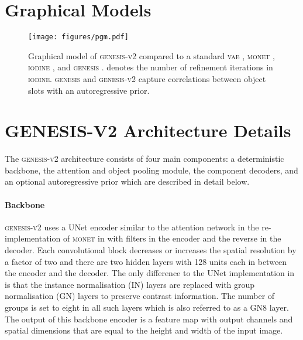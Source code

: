 \documentclass{article}
\begin{document}
\appendix


\section{Graphical Models}
\label{app:pgm}

\begin{figure}[h!]
	\centering
	\texttt{[image: figures/pgm.pdf]}
	\caption{Graphical model of \textsc{genesis-v2} compared to a standard \textsc{vae} \cite{kingma2013auto,rezende2014stochastic}, \textsc{monet} \cite{burgess2019monet}, \textsc{iodine} \cite{greff2019multi}, and \textsc{genesis} \cite{engelcke2020genesis}.  denotes the number of refinement iterations in \textsc{iodine}. \textsc{genesis} and \textsc{genesis-v2} capture correlations between object slots with an autoregressive prior.}
	\label{fig:pgms}
\end{figure}


\section{GENESIS-V2 Architecture Details}
\label{app:architecture}

The \textsc{genesis-v2} architecture consists of four main components: a deterministic backbone, the attention and object pooling module, the component decoders, and an optional autoregressive prior which are described in detail below.

\paragraph{Backbone}
\textsc{genesis-v2} uses a UNet \citep{ronneberger2015u} encoder similar to the attention network in the re-implementation of \textsc{monet} in \citet{engelcke2020genesis} with  filters in the encoder and the reverse in the decoder.
Each convolutional block decreases or increases the spatial resolution by a factor of two and there are two hidden layers with 128 units each in between the encoder and the decoder.
The only difference to the UNet implementation in \citet{engelcke2020genesis} is that the instance normalisation (IN) layers \citep{ulyanov2016instance} are replaced with group normalisation (GN) layers \citep{wu2018group} to preserve contrast information.
The number of groups is set to eight in all such layers which is also referred to as a GN8 layer. 
The output of this backbone encoder is a feature map  with  output channels and spatial dimensions that are equal to the height and width of the input image.
\end{document}

